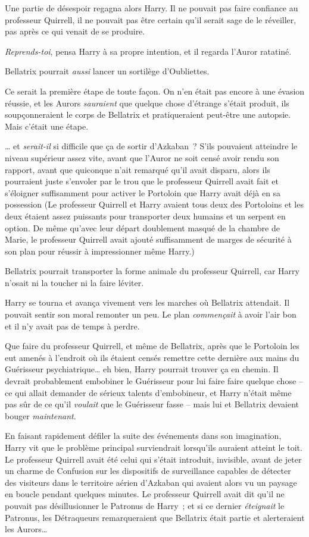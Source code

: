 Une partie de désespoir regagna alors Harry.
Il ne pouvait pas faire confiance au professeur Quirrell, il ne pouvait pas être certain qu'il serait sage de le réveiller, pas après ce qui venait de se produire.

\emph{Reprends-toi}, pensa Harry à sa propre intention, et il regarda l'Auror ratatiné.

Bellatrix pourrait \emph{aussi} lancer un sortilège d'Oubliettes.

Ce serait la première étape de toute façon.
On n'en était pas encore à une évasion réussie, et les Aurors \emph{sauraient} que quelque chose d'étrange s'était produit, ils soupçonneraient le corps de Bellatrix et pratiqueraient peut-être une autopsie.
Mais c'était une étape.

… et \emph{serait-il} si difficile que ça de sortir d'Azkaban~?
S'ils pouvaient atteindre le niveau supérieur assez vite, avant que l'Auror ne soit censé avoir rendu son rapport, avant que quiconque n'ait remarqué qu'il avait disparu, alors ils pourraient juste s'envoler par le trou que le professeur Quirrell avait fait et s'éloigner suffisamment pour activer le Portoloin que Harry avait déjà en sa possession (Le professeur Quirrell et Harry avaient tous deux des Portoloins et les deux étaient assez puissants pour transporter deux humains et un serpent en option.
De même qu'avec leur départ doublement masqué de la chambre de Marie, le professeur Quirrell avait ajouté suffisamment de marges de sécurité à son plan pour réussir à impressionner même Harry.)

Bellatrix pourrait transporter la forme animale du professeur Quirrell, car Harry n'osait ni la toucher ni la faire léviter.

Harry se tourna et avança vivement vers les marches où Bellatrix attendait.
Il pouvait sentir son moral remonter un peu.
Le plan \emph{commençait} à avoir l'air bon et il n'y avait pas de temps à perdre.

Que faire du professeur Quirrell, et même de Bellatrix, après que le Portoloin les eut amenés à l'endroit où ils étaient censés remettre cette dernière aux mains du Guérisseur psychiatrique… eh bien, Harry pourrait trouver ça en chemin.
Il devrait probablement embobiner le Guérisseur pour lui faire faire quelque chose -- ce qui allait demander de sérieux talents d'embobineur, et Harry n'était même pas sûr de ce qu'il \emph{voulait} que le Guérisseur fasse -- mais lui et Bellatrix devaient bouger \emph{maintenant}.

En faisant rapidement défiler la suite des événements dans son imagination, Harry vit que le problème principal surviendrait lorsqu'ils auraient atteint le toit.
Le professeur Quirrell avait été celui qui s'était introduit, invisible, avant de jeter un charme de Confusion sur les dispositifs de surveillance capables de détecter des visiteurs dans le territoire aérien d'Azkaban qui avaient alors vu un paysage en boucle pendant quelques minutes.
Le professeur Quirrell avait dit qu'il ne pouvait pas désillusionner le Patronus de Harry~; et si ce dernier \emph{éteignait} le Patronus, les Détraqueurs remarqueraient que Bellatrix était partie et alerteraient les Aurors…

